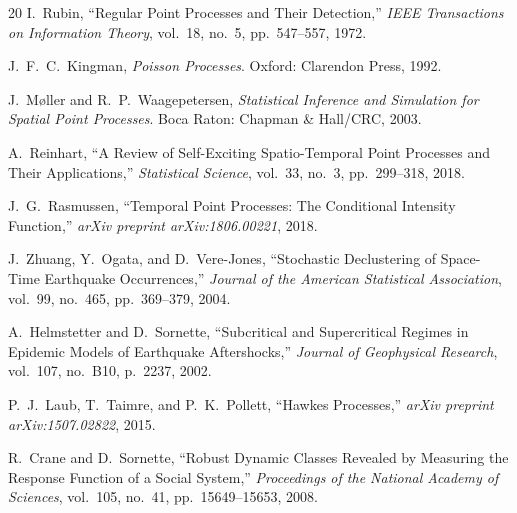 \documentclass[a4paper, 11pt]{article}
\begin{document}
\begin{thebibliography}{20}
 I.~Rubin, ``Regular Point Processes and Their Detection,'' \textit{IEEE Transactions on Information Theory}, vol.~18, no.~5, pp.~547--557, 1972.

 J.~F.~C.~Kingman, \textit{Poisson Processes}. Oxford: Clarendon Press, 1992.

 J.~M{\o}ller and R.~P.~Waagepetersen, \textit{Statistical Inference and Simulation for Spatial Point Processes}. Boca Raton: Chapman \& Hall/CRC, 2003.

 A.~Reinhart, ``A Review of Self-Exciting Spatio-Temporal Point Processes and Their Applications,'' \textit{Statistical Science}, vol.~33, no.~3, pp.~299--318, 2018.

 J.~G.~Rasmussen, ``Temporal Point Processes: The Conditional Intensity Function,'' \textit{arXiv preprint arXiv:1806.00221}, 2018.

 J.~Zhuang, Y.~Ogata, and D.~Vere-Jones, ``Stochastic Declustering of Space-Time Earthquake Occurrences,'' \textit{Journal of the American Statistical Association}, vol.~99, no.~465, pp.~369--379, 2004.

 A.~Helmstetter and D.~Sornette, ``Subcritical and Supercritical Regimes in Epidemic Models of Earthquake Aftershocks,'' \textit{Journal of Geophysical Research}, vol.~107, no.~B10, p.~2237, 2002.

 P.~J.~Laub, T.~Taimre, and P.~K.~Pollett, ``Hawkes Processes,'' \textit{arXiv preprint arXiv:1507.02822}, 2015.

 R.~Crane and D.~Sornette, ``Robust Dynamic Classes Revealed by Measuring the Response Function of a Social System,'' \textit{Proceedings of the National Academy of Sciences}, vol.~105, no.~41, pp.~15649--15653, 2008.
\end{thebibliography}
\end{document}
